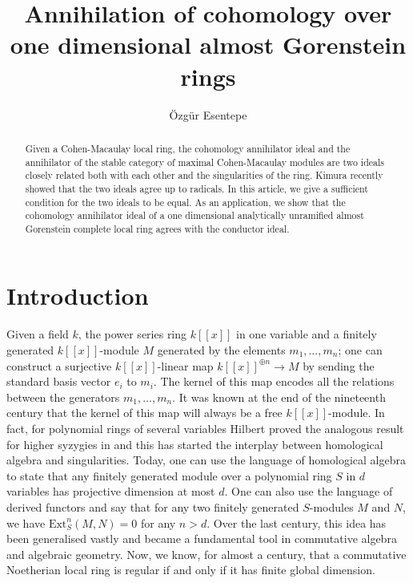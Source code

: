 \documentclass[12pt]{amsart}
\title{Annihilation of cohomology over one dimensional almost Gorenstein rings}
\author[\"{O}.~Esentepe]{\"{O}zg\"{u}r Esentepe}
\newcommand{\Ext}{\mathrm{Ext}}
\theoremstyle{definition}
\numberwithin{equation}{theorem}
\begin{document}
\begin{abstract}
   Given a Cohen-Macaulay local ring, the cohomology annihilator ideal and the annihilator of the stable category of maximal Cohen-Macaulay modules are two ideals closely related both with each other and the singularities of the ring. Kimura recently showed that the two ideals agree up to radicals. In this article, we give a sufficient condition for the two ideals to be equal. As an application, we show that the cohomology annihilator ideal of a one dimensional analytically unramified almost Gorenstein complete local ring agrees with the conductor ideal. 
\end{abstract}

\maketitle
\thispagestyle{empty}

\section{Introduction}

Given a field $k$, the power series ring $k[\![x]\!]$ in one variable and a finitely generated $k[\![x]\!]$-module $M$ generated by the elements $m_1, \ldots, m_n$; one can construct a surjective $k[\![x]\!]$-linear map $k[\![x]\!]^{\oplus n} \to M$ by sending the standard basis vector $e_i$ to $m_i$. The kernel of this map encodes all the relations between the generators $m_1, \ldots, m_n$. It was known at the end of the nineteenth century that the kernel of this map will always be a free $k[\![x]\!]$-module. In fact, for polynomial rings of several variables Hilbert proved the analogous result for higher syzygies in \cite{Hilbert} and this has started the interplay between homological algebra and singularities. Today, one can use the language of homological algebra to state that any finitely generated module over a polynomial ring $S$ in $d$ variables has projective dimension at most $d$. One can also use the language of derived functors and say that for any two finitely generated $S$-modules $M$ and $N$, we have $\Ext_S^n(M,N) = 0$ for any $n > d$. Over the last century, this idea has been generalised vastly and became a fundamental tool in commutative algebra and algebraic geometry. Now, we know, for almost a century, that a commutative Noetherian local ring is regular if and only if it has finite global dimension.
\end{document}
